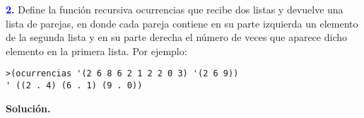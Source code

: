 \newpage\textbf{\textcolor{blue}{2.}} \Large
Define la función recursiva ocurrencias que recibe dos listas y devuelve una lista de parejas,
en donde cada pareja contiene en su parte izquierda un elemento de la segunda lista y en su
parte derecha el número de veces que aparece dicho elemento en la primera lista. Por ejemplo:

\begin{lstlisting}
>(ocurrencias '(2 6 8 6 2 1 2 2 0 3) '(2 6 9))
' ((2 . 4) (6 . 1) (9 . 0))
\end{lstlisting}

\textbf{Solución.} 

